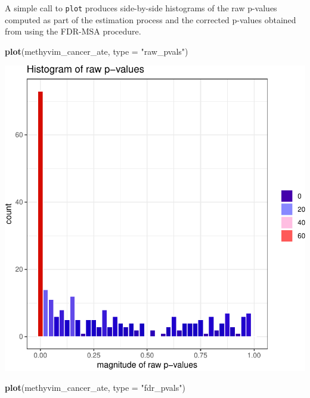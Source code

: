 \documentclass[9pt,a4paper,]{extarticle}
\newenvironment{Shaded}{\begin{snugshade}}{\end{snugshade}}
\newcommand{\DataTypeTok}[1]{\textcolor[rgb]{0.13,0.29,0.53}{#1}}
\newcommand{\KeywordTok}[1]{\textcolor[rgb]{0.13,0.29,0.53}{\textbf{#1}}}
\newcommand{\NormalTok}[1]{#1}
\newcommand{\StringTok}[1]{\textcolor[rgb]{0.31,0.60,0.02}{#1}}
\theoremstyle{definition}
\theoremstyle{definition}
\theoremstyle{definition}
\theoremstyle{remark}
\begin{document}
A simple call to \texttt{plot} produces side-by-side histograms of the raw p-values
computed as part of the estimation process and the corrected p-values obtained
from using the FDR-MSA procedure.

\begin{Shaded}
\begin{Highlighting}[]
\KeywordTok{plot}\NormalTok{(methyvim_cancer_ate, }\DataTypeTok{type =} \StringTok{"raw_pvals"}\NormalTok{)}
\end{Highlighting}
\end{Shaded}

\begin{center}\includegraphics{paper_BiocF1000_files/figure-latex/methyvim-pvals-raw-1} \end{center}

\begin{Shaded}
\begin{Highlighting}[]
\KeywordTok{plot}\NormalTok{(methyvim_cancer_ate, }\DataTypeTok{type =} \StringTok{"fdr_pvals"}\NormalTok{)}
\end{Highlighting}
\end{Shaded}
\end{document}
